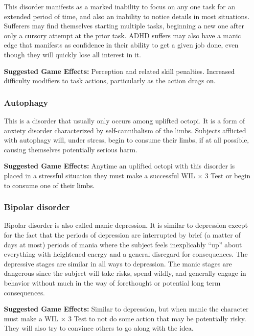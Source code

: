 This disorder manifests as a marked inability to focus on any one task for an extended period of time, and also an inability to notice details in most situations. Sufferers may find themselves starting multiple tasks, beginning a new one after only a cursory attempt at the prior task. ADHD suffers may also have a manic edge that manifests as confidence in their ability to get a given job done, even though they will quickly lose all interest in it.

\textbf{Suggested Game Effects:} Perception and related skill penalties. Increased difficulty modifiers to task actions, particularly as the action drags on.

\subsubsection{Autophagy}

This is a disorder that usually only occurs among uplifted octopi. It is a form of anxiety disorder characterized by self-cannibalism of the limbs. Subjects afflicted with autophagy will, under stress, begin to consume their limbs, if at all possible, causing themselves potentially serious harm.

\textbf{Suggested Game Effects:} Anytime an uplifted octopi with this disorder is placed in a stressful situation they must make a successful WIL $\times$ 3 Test or begin to consume one of their limbs.

\subsubsection{Bipolar disorder}

Bipolar disorder is also called manic depression. It is similar to depression except for the fact that the periods of depression are interrupted by brief (a matter of days at most) periods of mania where the subject feels inexplicably ``up” about everything with heightened energy and a general disregard for consequences. The depressive stages are similar in all ways to depression. The manic stages are dangerous since the subject will take risks, spend wildly, and generally engage in behavior without much in the way of forethought or potential long term consequences.

\textbf{Suggested Game Effects:} Similar to depression, but when manic the character must make a WIL $\times$ 3 Test to not do some action that may be potentially risky. They will also try to convince others to go along with the idea.

